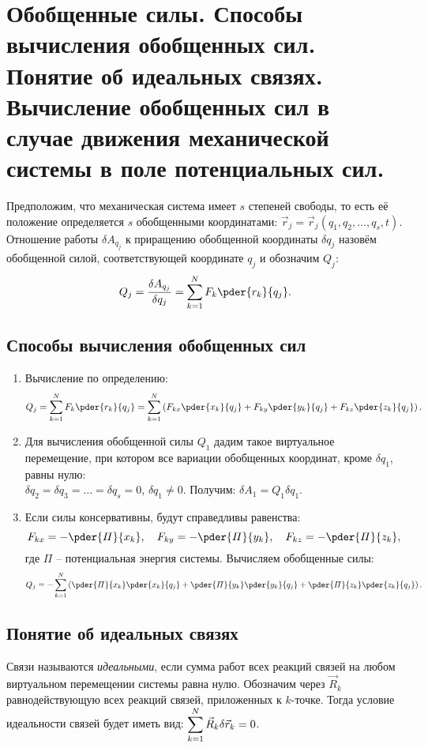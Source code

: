 \chapter{Обобщенные силы. Способы вычисления обобщенных сил. Понятие об
идеальных связях. Вычисление обобщенных сил в случае движения механической
системы в поле потенциальных сил.}

Предположим, что механическая система имеет \( s \) степеней свободы, то есть её
положение определяется \( s \) обобщенными координатами:
\( \vec{r}_j = \vec{r}_j(q_1, q_2, \ldots, q_s, t) \). Отношение работы
\( \delta A_{q_j} \) к приращению обобщенной координаты \( \delta q_j \) назовём
обобщенной силой, соответствующей координате \( q_j \) и обозначим \( Q_j \):
\[
    Q_j = \frac{\delta A_{q_j}}{\delta q_j} = \sum_{k=1}^N F_k\pder{r_k}{q_j}.
\]

\section{Способы вычисления обобщенных сил}
\begin{enumerate}
    \item Вычисление по определению:
    \[
        Q_j = \sum_{k=1}^N F_k\pder{r_k}{q_j} = \sum_{k=1}^N \left(F_{kx}
        \pder{x_k}{q_j} + F_{ky}\pder{y_k}{q_j} + F_{kz}\pder{z_k}{q_j}\right).
    \]
    
    \item Для вычисления обобщенной силы \( Q_1 \) дадим такое виртуальное
    перемещение, при котором все вариации обобщенных координат, кроме
    \( \delta q_1 \), равны нулю:\\
    \( \delta q_2 = \delta q_3 = \ldots = \delta q_s = 0 \),
    \( \delta q_1 \ne 0 \). Получим: \( \delta A_1 = Q_1\delta q_1 \).
    
    \item Если силы консервативны, будут справедливы равенства:
    \[
        F_{kx} = -\pder{\varPi}{x_k}, \quad F_{ky} = -\pder{\varPi}{y_k}, \quad
        F_{kz} = -\pder{\varPi}{z_k},
    \]
    где \( \varPi \) -- потенциальная энергия системы. Вычисляем обобщенные силы:
    \[
        Q_j = -\sum_{k=1}^N \left(\pder{\varPi}{x_k}\pder{x_k}{q_j} +
        \pder{\varPi}{y_k}\pder{y_k}{q_j} + \pder{\varPi}{z_k}\pder{z_k}{q_j}
        \right).
    \]
\end{enumerate}

\section{Понятие об идеальных связях}
Связи называются \emph{идеальными}, если сумма работ всех реакций связей на
любом виртуальном перемещении системы равна нулю. Обозначим через
\( \vec{R}_k \) равнодействующую всех реакций связей, приложенных к
\( k \)-точке. Тогда условие идеальности связей будет иметь вид:
\( \displaystyle \sum_{k=1}^N \vec{R}_k\delta\vec{r}_k = 0 \).

\newpage
